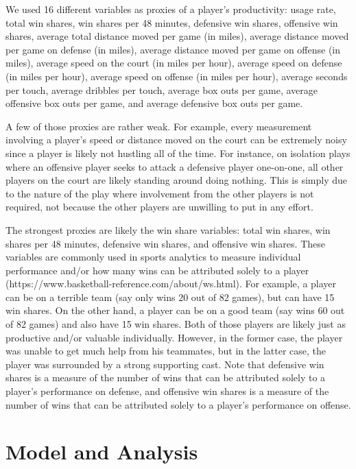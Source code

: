 \documentclass[12pt]{article}
\begin{document}
	We used 16 different variables as proxies of a player's productivity: usage rate, total win shares, win shares per 48 minutes, defensive win shares, offensive win shares, average total distance moved per game (in miles), average distance moved per game on defense (in miles), average distance moved per game on offense (in miles), average speed on the court (in miles per hour), average speed on defense (in miles per hour), average speed on offense (in miles per hour), average seconds per touch, average dribbles per touch, average box outs per game, average offensive box outs per game, and average defensive box outs per game. 
	
	A few of those proxies are rather weak. For example, every measurement involving a player's speed or distance moved on the court can be extremely noisy since a player is likely not hustling all of the time. For instance, on isolation plays where an offensive player seeks to attack a defensive player one-on-one, all other players on the court are likely standing around doing nothing. This is simply due to the nature of the play where involvement from the other players is not required, not because the other players are unwilling to put in any effort. 
	
	The strongest proxies are likely the win share variables: total win shares, win shares per 48 minutes, defensive win shares, and offensive win shares. These variables are commonly used in sports analytics to measure individual performance and/or how many wins can be attributed solely to a player (https://www.basketball-reference.com/about/ws.html). For example, a player can be on a terrible team (say only wins 20 out of 82 games), but can have 15 win shares. On the other hand, a player can be on a good team (say wins 60 out of 82 games) and also have 15 win shares. Both of those players are likely just as productive and/or valuable individually. However, in the former case, the player was unable to get much help from his teammates, but in the latter case, the player was surrounded by a strong supporting cast. Note that defensive win shares is a measure of the number of wins that can be attributed solely to a player's performance on defense, and offensive win shares is a measure of the number of wins that can be attributed solely to a player's performance on offense. 
	
	\section{Model and Analysis}
	
\end{document}
